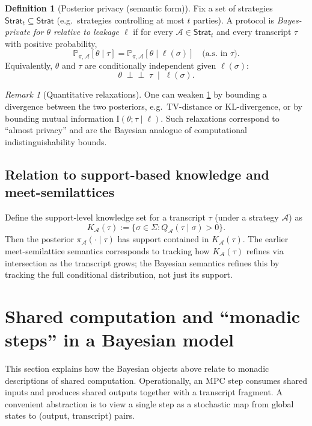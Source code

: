 \documentclass[11pt,a4paper]{article}
\theoremstyle{definition}
\newtheorem{definition}[theorem]{Definition}
\theoremstyle{remark}
\newtheorem{remark}[theorem]{Remark}
\newcommand{\Prb}{\mathbb{P}}
\newcommand{\TV}{\mathrm{TV}}
\newcommand{\KL}{\mathrm{KL}}
\newcommand{\I}{\mathrm{I}}
\newcommand{\Leak}{\ell}
\newcommand{\post}{\pi}
\begin{document}
\begin{definition}[Posterior privacy (semantic form)]
\label{def:posterior-privacy}
Fix a set of strategies \(\mathsf{Strat}_t\subseteq \mathsf{Strat}\) (e.g.\ strategies controlling at most \(t\) parties). A protocol is \emph{Bayes-private for \(\theta\) relative to leakage \(\Leak\)} if for every \(\mathcal{A}\in\mathsf{Strat}_t\) and every transcript \(\tau\) with positive probability,
\[
\Prb_{\post,\mathcal{A}}[\theta \mid \tau] = \Prb_{\post,\mathcal{A}}[\theta \mid \Leak(\sigma)] \quad \text{(a.s. in } \tau\text{)}.
\]
Equivalently, \(\theta\) and \(\tau\) are conditionally independent given \(\Leak(\sigma)\):
\[
\theta \;\perp\!\!\!\perp\; \tau \;\mid\; \Leak(\sigma).
\]
\end{definition}

\begin{remark}[Quantitative relaxations]
One can weaken \cref{def:posterior-privacy} by bounding a divergence between the two posteriors, e.g.\ \(\TV\)-distance or \(\KL\)-divergence, or by bounding mutual information \(\I(\theta;\tau\mid \Leak)\). Such relaxations correspond to ``almost privacy'' and are the Bayesian analogue of computational indistinguishability bounds.
\end{remark}

\subsection{Relation to support-based knowledge and meet-semilattices}
Define the support-level knowledge set for a transcript \(\tau\) (under a strategy \(\mathcal{A}\)) as
\[
K_{\mathcal{A}}(\tau) := \{\sigma\in\Sigma : Q_{\mathcal{A}}(\tau\mid\sigma)>0\}.
\]
Then the posterior \(\post_{\mathcal{A}}(\cdot\mid\tau)\) has support contained in \(K_{\mathcal{A}}(\tau)\). The earlier meet-semilattice semantics corresponds to tracking how \(K_{\mathcal{A}}(\tau)\) refines via intersection as the transcript grows; the Bayesian semantics refines this by tracking the full conditional distribution, not just its support.

\section{Shared computation and ``monadic steps'' in a Bayesian model}
\label{sec:bayes-monad}

This section explains how the Bayesian objects above relate to monadic descriptions of shared computation.
Operationally, an MPC step consumes shared inputs and produces shared outputs together with a transcript fragment. A convenient abstraction is to view a single step as a stochastic map from global states to (output, transcript) pairs.
\end{document}
